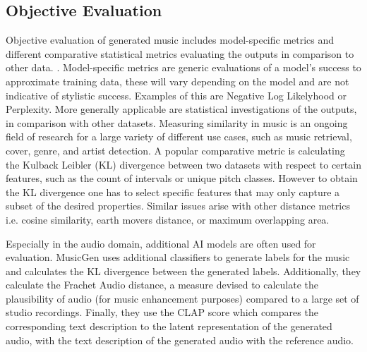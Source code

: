 \subsection{Objective Evaluation}

Objective evaluation of generated music includes model-specific metrics and different comparative statistical metrics evaluating the outputs in comparison to other data. \cite{Xiong_Wang_ai_eval_methods_2023}. Model-specific metrics are generic evaluations of a model's success to approximate training data, these will vary depending on the model and are not indicative of stylistic success. Examples of this are Negative Log Likelyhood \cite{Huang_Vaswani_Uszkoreit_Shazeer_Simon_Hawthorne_Dai_Hoffman_Dinculescu_Eck_2018} or Perplexity\cite{Rütte_figaro_2023}. 
More generally applicable are statistical investigations of the outputs, in comparison with other datasets. Measuring similarity in music is an ongoing field of research \cite{Gurjar_Moon_similarity_2018} for a large variety of different use cases, such as music retrieval, cover, genre, and artist detection. A popular comparative metric is calculating the Kulback Leibler (KL) divergence between two datasets with respect to certain features, such as the count of intervals or unique pitch classes. However to obtain the KL divergence one has to select specific features that may only capture a subset of the desired properties. Similar issues arise with other distance metrics i.e. cosine similarity, earth movers distance, or maximum overlapping area. 

Especially in the audio domain, additional AI models are often used for evaluation. MusicGen \cite{copet2023simple} uses additional classifiers to generate labels for the music and calculates the KL divergence between the generated labels. Additionally, they calculate the Frachet Audio distance, a measure devised to calculate the plausibility of audio (for music enhancement purposes) compared to a large set of studio recordings\cite{Kilgour_Frachet_2019}. Finally, they use the CLAP score which compares the corresponding text description to the latent representation of the generated audio, with the text description of the generated audio with the reference audio. \cite{Elizalde_Deshmukh_Ismail_Wang_2023}
